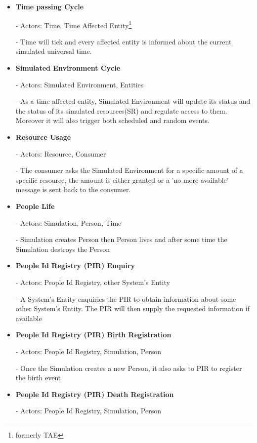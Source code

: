 \begin{itemize}
  \item \textbf{Time passing Cycle}  
	
	- Actors: Time, Time Affected Entity\footnote{formerly TAE}

	- Time will tick and every affected entity is informed about the current simulated universal time.

  \item \textbf{Simulated Environment Cycle}

	- Actors: Simulated Environment, Entities

	- As a time affected entity, Simulated Environment will update its
status and the status of its simulated resources(SR) and regulate access to
them. Moreover it will also trigger both scheduled and random events.

  \item \textbf{Resource Usage}

	- Actors: Resource, Consumer

	- The consumer asks the Simulated Environment for a specific amount of a specific resource, the amount is either granted or a 'no more available' message is sent back to the consumer.

  \item \textbf{People Life} 

	- Actors: Simulation, Person, Time

	- Simulation creates Person then Person lives and after some time the Simulation destroys the Person

  \item \textbf{People Id Registry (PIR) Enquiry}

	- Actors: People Id Registry, other System's Entity

	- A System's Entity enquiries the PIR to obtain information about some other System's Entity. The PIR will then supply the requested information  if available

  \item \textbf{People Id Registry (PIR) Birth Registration}

	- Actors: People Id Registry, Simulation, Person

	- Once the Simulation creates a new Person, it also asks to PIR to register the birth event

  \item \textbf{People Id Registry (PIR) Death Registration}

	- Actors: People Id Registry, Simulation, Person


\end{itemize}
